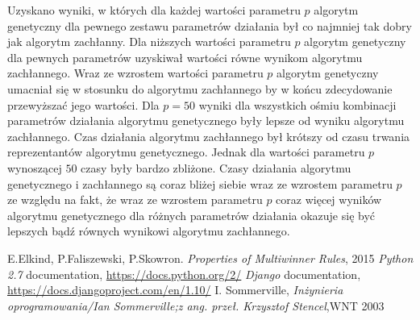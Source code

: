 \documentclass[polish,11pt]{aghthesis}
\begin{document}
\noindent Uzyskano wyniki, w których dla każdej wartości parametru $p$ algorytm genetyczny dla pewnego zestawu parametrów działania był co najmniej tak dobry jak algorytm zachłanny. Dla niższych wartości parametru $p$ algorytm genetyczny dla pewnych parametrów uzyskiwał wartości równe wynikom algorytmu zachłannego. Wraz ze wzrostem wartości parametru $p$ algorytm genetyczny umacniał się w stosunku do algorytmu zachłannego by w końcu zdecydowanie przewyższać jego wartości. Dla $p=50$ wyniki dla wszystkich ośmiu kombinacji parametrów działania algorytmu genetycznego były lepsze od wyniku algorytmu zachłannego. Czas działania algorytmu zachłannego był krótszy od czasu trwania reprezentantów algorytmu genetycznego. Jednak dla wartości parametru $p$ wynoszącej $50$ czasy były bardzo zbliżone. Czasy działania algorytmu genetycznego i zachłannego są coraz bliżej siebie wraz ze wzrostem parametru $p$ ze względu na fakt, że wraz ze wzrostem parametru $p$ coraz więcej wyników algorytmu genetycznego dla różnych parametrów działania okazuje się być lepszych bądź równych wynikowi algorytmu zachłannego.    
\newpage



%
\begin{thebibliography}{99}
\bibitem{}
E.Elkind, P.Faliszewski, P.Skowron. \textit{Properties of Multiwinner Rules}, 2015
\bibitem{}
\textit{Python 2.7} documentation, \url{https://docs.python.org/2/} 
\bibitem{}
\textit{Django} documentation, \url{https://docs.djangoproject.com/en/1.10/}
\bibitem{}
I. Sommerville, \textit{Inżynieria oprogramowania/Ian Sommerville;z ang. przeł. Krzysztof Stencel},WNT 2003

\end{thebibliography}
\end{document}
